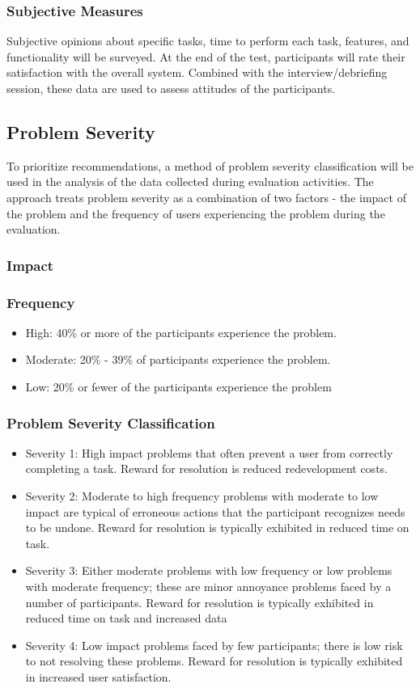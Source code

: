 \subsubsection{Subjective Measures}
Subjective opinions about specific tasks, time to perform each task, features, and functionality will be surveyed. At the end of the test, participants will rate their satisfaction with the overall system. Combined with the interview/debriefing session, these data are used to assess attitudes of the participants.

\subsection{Problem Severity}
To prioritize recommendations, a method of problem severity classification will be used in the analysis of the data collected during evaluation activities. The approach treats problem severity as a combination of two factors - the impact of the problem and the frequency of users experiencing the problem during the evaluation.
\subsubsection{Impact}
\subsubsection{Frequency}
	\begin{itemize}
		\item High: 40\% or more of the participants experience the problem.
		\item Moderate: 20\% - 39\% of participants experience the problem.
		\item Low: 20\% or fewer of the participants experience the problem
	\end{itemize}
\subsubsection{Problem Severity Classification}
	\begin{itemize}
		\item Severity 1: High impact problems that often prevent a user from correctly completing a task. Reward for resolution is reduced redevelopment costs.
		\item Severity 2: Moderate to high frequency problems with moderate to low impact are typical of erroneous actions that the participant recognizes needs to be undone. Reward for resolution is typically exhibited in reduced time on task.
		\item Severity 3: Either moderate problems with low frequency or low problems with moderate frequency; these are minor annoyance problems faced by a number of participants. Reward for resolution is typically exhibited in reduced time on task and increased data
		\item Severity 4: Low impact problems faced by few participants; there is low risk to not resolving these problems. Reward for resolution is typically exhibited in increased user satisfaction.
	\end{itemize}


